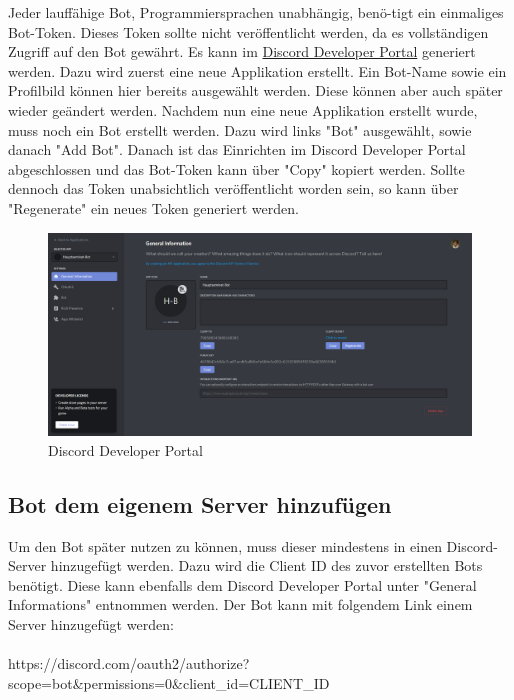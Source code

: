 \documentclass[sigplan,screen]{acmart}
\begin{document}
Jeder lauffähige Bot, Programmiersprachen unabhängig, benö-tigt ein einmaliges Bot-Token. Dieses Token sollte nicht veröffentlicht werden, da es vollständigen Zugriff auf den Bot gewährt. Es kann im \hyperlink{https://discord.com/developers/applications}{Discord Developer Portal} generiert werden. Dazu wird zuerst eine neue Applikation erstellt. Ein Bot-Name sowie ein Profilbild können hier bereits ausgewählt werden. Diese können aber auch später wieder geändert werden. Nachdem nun eine neue Applikation erstellt wurde, muss noch ein Bot erstellt werden. Dazu wird links "Bot" ausgewählt, sowie danach "Add Bot".
Danach ist das Einrichten im Discord Developer Portal abgeschlossen und das Bot-Token kann über "Copy" kopiert werden. Sollte dennoch das Token unabsichtlich veröffentlicht worden sein, so kann über "Regenerate" ein neues Token generiert werden. \cite{didev1} 
\begin{figure}[h]
  \centering
  \includegraphics[width=\linewidth]{discord_devoloper}
  \caption{Discord Developer Portal}
\end{figure}

\newpage

\subsection{Bot dem eigenem Server hinzufügen}

Um den Bot später nutzen zu können, muss dieser mindestens in einen Discord-Server hinzugefügt werden. Dazu wird die Client ID des zuvor erstellten Bots benötigt. Diese kann ebenfalls dem Discord Developer Portal unter "General Informations" entnommen werden. Der Bot kann mit folgendem Link einem Server hinzugefügt werden: \\ \\
https://discord.com/oauth2/authorize? \\ 
scope=bot\&permissions=0\&client\_id=CLIENT\_ID \\
\end{document}
